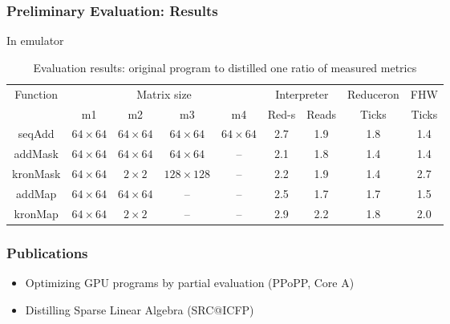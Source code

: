 \documentclass[xcolor=table,aspectratio=169]{beamer}
\begin{document}
\begin{frame}[fragile]
  \frametitle{Preliminary Evaluation: Results}
  In emulator
  \begin{table}
    \centering    
    \begin{tabular}{|c|c|c|c|c||c|c|c|c|}
        \hline
        \multirow{2}{*}{Function} &  \multicolumn{4}{c||}{Matrix size}  & \multicolumn{2}{c|}{Interpreter}            & Reduceron & FHW\\
        \cline{2-9}
                                  &   m1 & m2 & m3 & m4                & Red-s & Reads                               & Ticks     & Ticks \\
        \hline
        seqAdd   & $64 \times 64$ & $64 \times 64$ & $64 \times 64$ & $64 \times 64$ & 2.7          & 1.9        & 1.8 & 1.4  \\ 
        addMask  & $64 \times 64$ & $64 \times 64$ & $64 \times 64$ & --             & 2.1          & 1.8        & 1.4 & 1.4  \\ 
        kronMask & $64 \times 64$ & $2 \times 2$   &$128 \times 128$& --             & 2.2          & 1.9        & 1.4 & 2.7  \\ 
        addMap   & $64 \times 64$ & $64 \times 64$ & --             & --             & 2.5          & 1.7        & 1.7 & 1.5  \\
        kronMap  & $64 \times 64$ & $2 \times 2$   & --             & --             & 2.9          & 2.2        & 1.8 & 2.0  \\ 
        \hline
        
    \end{tabular}
    \caption{Evaluation results: original program to distilled one ratio of measured metrics}
    \label{tbl:evaluationResults}
  \end{table} 
\end{frame}

\begin{frame}[fragile]
  \frametitle{Publications}
    \begin{itemize}
        \item Optimizing GPU programs by partial evaluation (PPoPP, Core A)
        \item Distilling Sparse Linear Algebra (SRC@ICFP)
    \end{itemize}
\end{frame}
\end{document}
